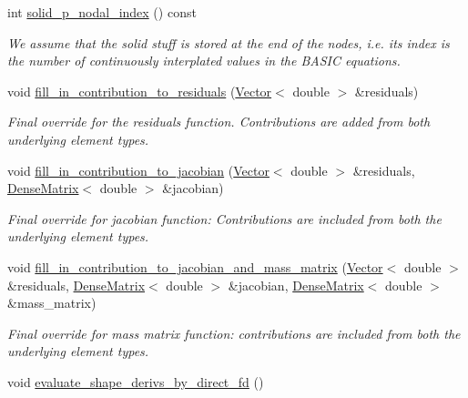 \begin{DoxyCompactItemize}
int \hyperlink{classoomph_1_1PseudoSolidNodeUpdateElement_ad78c40ba5be3d9b922dfd92f2e683ba8}{solid\+\_\+p\+\_\+nodal\+\_\+index} () const
\begin{DoxyCompactList}\small\item\em We assume that the solid stuff is stored at the end of the nodes, i.\+e. its index is the number of continuously interplated values in the B\+A\+S\+IC equations. \end{DoxyCompactList}\item 
void \hyperlink{classoomph_1_1PseudoSolidNodeUpdateElement_a12009b16c000c65ad384c74246074384}{fill\+\_\+in\+\_\+contribution\+\_\+to\+\_\+residuals} (\hyperlink{classoomph_1_1Vector}{Vector}$<$ double $>$ \&residuals)
\begin{DoxyCompactList}\small\item\em Final override for the residuals function. Contributions are added from both underlying element types. \end{DoxyCompactList}\item 
void \hyperlink{classoomph_1_1PseudoSolidNodeUpdateElement_a6e3b3193e2d66317dc45f17217ddb5c3}{fill\+\_\+in\+\_\+contribution\+\_\+to\+\_\+jacobian} (\hyperlink{classoomph_1_1Vector}{Vector}$<$ double $>$ \&residuals, \hyperlink{classoomph_1_1DenseMatrix}{Dense\+Matrix}$<$ double $>$ \&jacobian)
\begin{DoxyCompactList}\small\item\em Final override for jacobian function\+: Contributions are included from both the underlying element types. \end{DoxyCompactList}\item 
void \hyperlink{classoomph_1_1PseudoSolidNodeUpdateElement_aba0869b0de889df9be90647c28632f8b}{fill\+\_\+in\+\_\+contribution\+\_\+to\+\_\+jacobian\+\_\+and\+\_\+mass\+\_\+matrix} (\hyperlink{classoomph_1_1Vector}{Vector}$<$ double $>$ \&residuals, \hyperlink{classoomph_1_1DenseMatrix}{Dense\+Matrix}$<$ double $>$ \&jacobian, \hyperlink{classoomph_1_1DenseMatrix}{Dense\+Matrix}$<$ double $>$ \&mass\+\_\+matrix)
\begin{DoxyCompactList}\small\item\em Final override for mass matrix function\+: contributions are included from both the underlying element types. \end{DoxyCompactList}\item 
void \hyperlink{classoomph_1_1PseudoSolidNodeUpdateElement_ad35128b838a51f8db6c3d51964b9b00a}{evaluate\+\_\+shape\+\_\+derivs\+\_\+by\+\_\+direct\+\_\+fd} ()

\end{DoxyCompactItemize}
